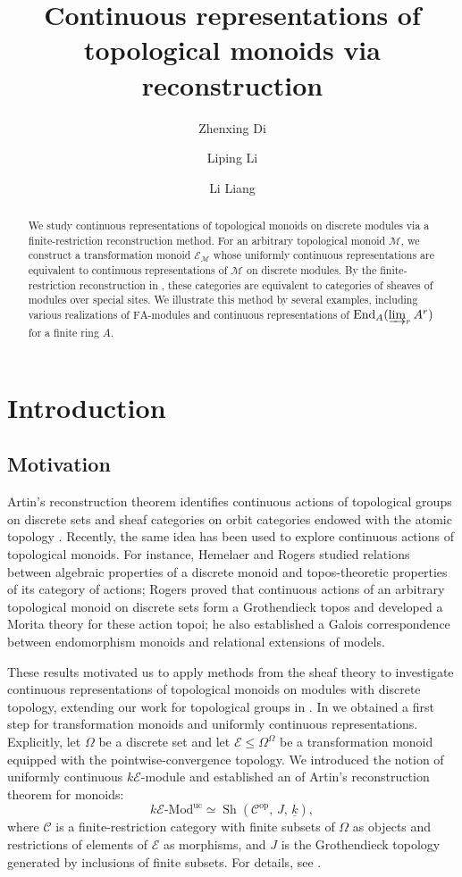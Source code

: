 \documentclass[10pt, reqno]{amsart}
\title[Continuous Representations of Topological Monoids]{Continuous representations of topological monoids via reconstruction}
\author[Z.X. Di]{Zhenxing Di}
\author[L.P. Li]{Liping Li}
\author[L. Liang]{Li Liang}
\theoremstyle{plain}
\numberwithin{equation}{section}
\theoremstyle{definition}
\newcommand{\Sh}{\operatorname{Sh}}
\newcommand{\Mod}{{\textrm{-}\mathrm{Mod}}}
\newcommand{\op}{\mathrm{op}}
\newcommand{\FA}{\mathrm{FA}}
\newcommand{\M}{\mathscr M}
\newcommand{\E}{\mathscr E}
\newcommand{\C}{\mathscr C}
\begin{document}
\begin{abstract}
We study continuous representations of topological monoids on discrete modules via a finite-restriction reconstruction method. For an arbitrary topological monoid $\M$, we construct a transformation monoid $\E_\M$ whose uniformly continuous representations are equivalent to continuous representations of $\M$ on discrete modules. By the finite-restriction reconstruction in \cite{LiRel}, these categories are equivalent to categories of sheaves of modules over special sites. We illustrate this method by several examples, including various realizations of $\FA$-modules and continuous representations of $\operatorname{End}_A(\varinjlim_r A^r)$ for a finite ring $A$.
\end{abstract}


\maketitle


\section{Introduction}

\subsection{Motivation}

Artin's reconstruction theorem identifies continuous actions of topological groups on discrete sets and sheaf categories on orbit categories endowed with the atomic topology \cite{MacLaneMoerdijk, Jo}. Recently, the same idea has been used to explore continuous actions of topological monoids. For instance, Hemelaer and Rogers \cite{HR} studied relations between algebraic properties of a discrete monoid and topos-theoretic properties of its category of actions; Rogers \cite{Rogers} proved that continuous actions of an arbitrary topological monoid on discrete sets form a Grothendieck topos and developed a Morita theory for these action topoi; he \cite{Rogers1} also established a Galois correspondence between endomorphism monoids and relational extensions of models.

These results motivated us to apply methods from the sheaf theory to investigate continuous representations of topological monoids on modules with discrete topology, extending our work for topological groups in \cite{DLLX}. In \cite{LiRel} we obtained a first step for transformation monoids and uniformly continuous representations. Explicitly, let $\Omega$ be a discrete set and let $\E \leqslant \Omega^{\Omega}$ be a transformation monoid equipped with the pointwise-convergence topology. We introduced the notion of uniformly continuous $k\E$-module and established an of Artin's reconstruction theorem for monoids:
\[
k\E \Mod^{\mathrm{uc}} \simeq \Sh(\C^{\op}, \, J, \, \underline{k}),
\]
where $\C$ is a finite-restriction category with finite subsets of $\Omega$ as objects and restrictions of elements of $\E$ as morphisms, and $J$ is the Grothendieck topology generated by inclusions of finite subsets. For details, see \cite[Subsection 7.4]{LiRel}.
\end{document}
